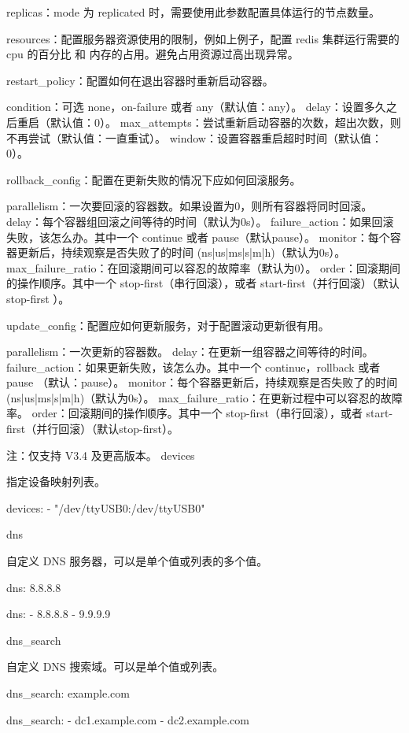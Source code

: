 replicas：mode 为 replicated 时，需要使用此参数配置具体运行的节点数量。

resources：配置服务器资源使用的限制，例如上例子，配置 redis 集群运行需要的 cpu 的百分比 和 内存的占用。避免占用资源过高出现异常。

restart_policy：配置如何在退出容器时重新启动容器。

    condition：可选 none，on-failure 或者 any（默认值：any）。
    delay：设置多久之后重启（默认值：0）。
    max_attempts：尝试重新启动容器的次数，超出次数，则不再尝试（默认值：一直重试）。
    window：设置容器重启超时时间（默认值：0）。

rollback_config：配置在更新失败的情况下应如何回滚服务。

    parallelism：一次要回滚的容器数。如果设置为0，则所有容器将同时回滚。
    delay：每个容器组回滚之间等待的时间（默认为0s）。
    failure_action：如果回滚失败，该怎么办。其中一个 continue 或者 pause（默认pause）。
    monitor：每个容器更新后，持续观察是否失败了的时间 (ns|us|ms|s|m|h)（默认为0s）。
    max_failure_ratio：在回滚期间可以容忍的故障率（默认为0）。
    order：回滚期间的操作顺序。其中一个 stop-first（串行回滚），或者 start-first（并行回滚）（默认 stop-first ）。

update_config：配置应如何更新服务，对于配置滚动更新很有用。

    parallelism：一次更新的容器数。
    delay：在更新一组容器之间等待的时间。
    failure_action：如果更新失败，该怎么办。其中一个 continue，rollback 或者pause （默认：pause）。
    monitor：每个容器更新后，持续观察是否失败了的时间 (ns|us|ms|s|m|h)（默认为0s）。
    max_failure_ratio：在更新过程中可以容忍的故障率。
    order：回滚期间的操作顺序。其中一个 stop-first（串行回滚），或者 start-first（并行回滚）（默认stop-first）。

注：仅支持 V3.4 及更高版本。
devices

指定设备映射列表。

devices:
  - "/dev/ttyUSB0:/dev/ttyUSB0"

dns

自定义 DNS 服务器，可以是单个值或列表的多个值。

dns: 8.8.8.8

dns:
  - 8.8.8.8
  - 9.9.9.9

dns_search

自定义 DNS 搜索域。可以是单个值或列表。

dns_search: example.com

dns_search:
  - dc1.example.com
  - dc2.example.com

